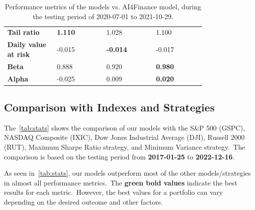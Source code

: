 \documentclass[../xlapes02]{subfiles}
\begin{document}
\begin{table}[H]
{\begin{tabular}{*{4}{|m{0.20\linewidth}|}}
                \bfseries Tail ratio          & \color[HTML]{00F000} \bfseries 1.110 & 1.028                                 & 1.100 \\[0.2cm]
                \bfseries Daily value at risk & -0.015                               & \color[HTML]{00F000} \bfseries -0.014 & -0.017 \\[0.2cm]
                \bfseries Beta                & 0.888                                & 0.920                                 & \color[HTML]{00F000} \bfseries 0.980 \\[0.2cm]
                \bfseries Alpha               & -0.025                               & 0.009                                 & \color[HTML]{00F000} \bfseries 0.020 \\[0.2cm]
                \bottomrule
            \end{tabular}
        }
        \caption{Performance metrics of the models vs. AI4Finance model, during the testing period of 2020-07-01 to 2021-10-29.}
        \label{tab:stats2}
    \end{table}

    \subsection{Comparison with Indexes and Strategies}\label{subsec:indexes-and-strategies}
    The~\cref{tab:stats} shows the comparison of our models with the S\&P 500 (GSPC), NASDAQ Composite (IXIC), Dow Jones Industrial Average (DJI), Russell 2000 (RUT), Maximum Sharpe Ratio strategy, and Minimum Variance strategy.\ The comparison is based on the testing period from \textbf{2017-01-25} to \textbf{2022-12-16}.

    As seen in~\cref{tab:stats}, our models outperform most of the other models/strategies in almost all performance metrics.\ The \textcolor[HTML]{00F000}{\textbf{green bold values}} indicate the best results for each metric.\ However, the best values for a portfolio can vary depending on the desired outcome and other factors.
\end{document}
